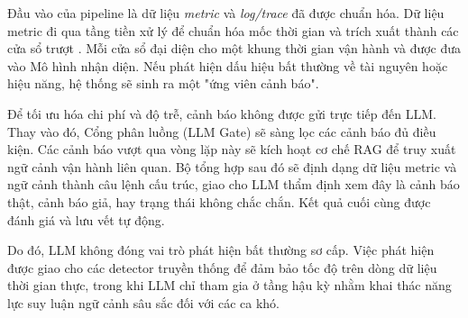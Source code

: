 Đầu vào của pipeline là dữ liệu \textit{metric} và \textit{log/trace} đã được chuẩn hóa. Dữ liệu metric đi qua tầng tiền xử lý để chuẩn hóa mốc thời gian và trích xuất thành các cửa sổ trượt . Mỗi cửa sổ đại diện cho một khung thời gian vận hành và được đưa vào Mô hình nhận diện. Nếu phát hiện dấu hiệu bất thường về tài nguyên hoặc hiệu năng, hệ thống sẽ sinh ra một "ứng viên cảnh báo".

Để tối ưu hóa chi phí và độ trễ, cảnh báo không được gửi trực tiếp đến LLM. Thay vào đó, Cổng phân luồng (LLM Gate) sẽ sàng lọc các cảnh báo đủ điều kiện. Các cảnh báo vượt qua vòng lặp này sẽ kích hoạt cơ chế RAG để truy xuất ngữ cảnh vận hành liên quan. Bộ tổng hợp sau đó sẽ định dạng dữ liệu metric và ngữ cảnh thành câu lệnh cấu trúc, giao cho LLM thẩm định xem đây là cảnh báo thật, cảnh báo giả, hay trạng thái không chắc chắn. Kết quả cuối cùng được đánh giá và lưu vết tự động.

Do đó, LLM không đóng vai trò phát hiện bất thường sơ cấp. Việc phát hiện được giao cho các detector truyền thống để đảm bảo tốc độ trên dòng dữ liệu thời gian thực, trong khi LLM chỉ tham gia ở tầng hậu kỳ nhằm khai thác năng lực suy luận ngữ cảnh sâu sắc đối với các ca khó.

